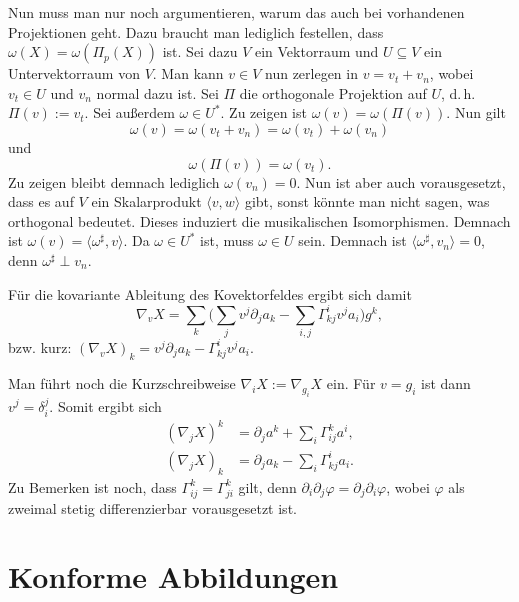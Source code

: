 Nun muss man nur noch argumentieren, warum das auch bei vorhandenen
Projektionen geht. Dazu braucht man lediglich festellen, dass
$\omega(X)=\omega(\Pi_p(X))$ ist. Sei dazu $V$ ein Vektorraum
und $U\subseteq V$ ein Untervektorraum von $V$. Man kann $v\in V$
nun zerlegen in $v=v_t+v_n$, wobei $v_t\in U$ und $v_n$ normal
dazu ist. Sei $\Pi$ die orthogonale Projektion auf $U$, d.\,h.
$\Pi(v):=v_t$. Sei außerdem $\omega\in U^*$. Zu zeigen ist
$\omega(v)=\omega(\Pi(v))$. Nun gilt
\begin{equation}
\omega(v) = \omega(v_t+v_n) = \omega(v_t)+\omega(v_n)
\end{equation}
und
\begin{equation}
\omega(\Pi(v)) = \omega(v_t).
\end{equation}
Zu zeigen bleibt demnach lediglich $\omega(v_n)=0$. Nun ist aber
auch vorausgesetzt, dass es auf $V$ ein Skalarprodukt
$\langle v,w\rangle$ gibt, sonst könnte man nicht sagen, was
orthogonal bedeutet. Dieses induziert die musikalischen Isomorphismen.
Demnach ist $\omega(v)=\langle\omega^\sharp,v\rangle$. Da $\omega\in U^*$
ist, muss $\omega\in U$ sein. Demnach ist
$\langle\omega^\sharp,v_n\rangle=0$, denn $\omega^\sharp\perp v_n$.

Für die kovariante Ableitung des Kovektorfeldes ergibt sich damit
\begin{equation}
\nabla_v X = \sum_k \bigg(\sum_j v^j\partial_j a_k
-\sum_{i,j} \Gamma_{kj}^i v^j a_i\bigg)g^k,
\end{equation}
bzw. kurz: $(\nabla_v X)_k = v^j\partial_j a_k-\Gamma_{kj}^i v^j a_i$.

Man führt noch die Kurzschreibweise $\nabla_i X := \nabla_{g_i} X$
ein. Für $v=g_i$ ist dann $v^j = \delta_i^j$. Somit ergibt sich
\begin{align}
(\nabla_j X)^k &= \partial_j a^k + {\textstyle\sum_i}\Gamma_{ij}^k a^i,\\
(\nabla_j X)_k &= \partial_j a_k - {\textstyle\sum_i}\Gamma_{kj}^i a_i.
\end{align}
Zu Bemerken ist noch, dass $\Gamma_{ij}^k = \Gamma_{ji}^k$ gilt,
denn $\partial_i\partial_j\varphi = \partial_j\partial_i\varphi$,
wobei $\varphi$ als zweimal stetig differenzierbar vorausgesetzt ist.

\section{Konforme Abbildungen}

